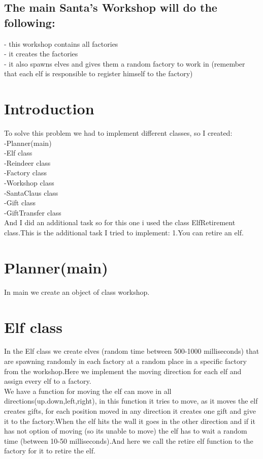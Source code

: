 \documentclass{article}
\begin{document}
\subsection{The main Santa’s Workshop will do the following:}

- this workshop contains all factories\\
- it creates the factories\\
- it also spawns elves and gives them a random factory to work in (remember that each elf is responsible to register himself to the factory)\\

\newpage

\section{Introduction}

 To solve this problem we had to implement different classes, so I created:\\
 -Planner(main)\\
 -Elf class\\
 -Reindeer class\\
 -Factory class\\
 -Workshop class\\
 -SantaClaus class\\
 -Gift class\\
 -GiftTransfer class\\
 
 And I did an additional task so for this one i used the class ElfRetirement class.This is the additional task I tried to implement: 1.You can retire an elf.

\section{Planner(main)}
In main we create an object of class workshop.


\section{Elf class}

In the Elf class we create elves (random time between 500-1000 milliseconds) that are spawning randomly in each factory at a random place in a specific factory from the workshop.Here we implement the moving direction for each elf and assign every elf to a factory.\\
We have a function for moving the elf can move in all directions(up.down,left,right), in this function it tries to move, as it moves the elf creates gifts, for each position moved in any direction it creates one gift and give it to the factory.When the elf hits the wall it goes in the other direction and if it has not option of moving (so its unable to move) the elf has to wait a random time (between 10-50 milliseconds).And here we call the retire elf function to the factory for it to retire the elf.
\end{document}
